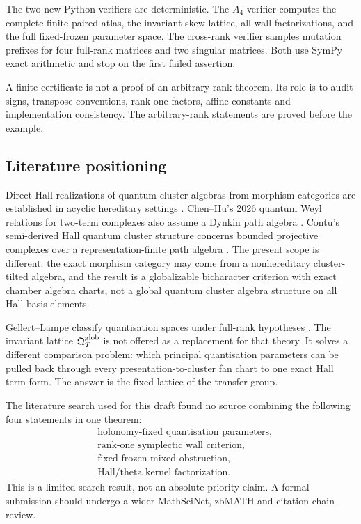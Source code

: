 The two new Python verifiers are deterministic.  The $A_4$ verifier computes
the complete finite paired atlas, the invariant skew lattice, all wall
factorizations, and the full fixed-frozen parameter space.  The cross-rank
verifier samples mutation prefixes for four full-rank matrices and two
singular matrices.  Both use SymPy exact arithmetic and stop on the first
failed assertion.

A finite certificate is not a proof of an arbitrary-rank theorem.  Its role is
to audit signs, transpose conventions, rank-one factors, affine constants and
implementation consistency.  The arbitrary-rank statements are proved before
the example.

\subsection{Literature positioning}

Direct Hall realizations of quantum cluster algebras from morphism categories
are established in acyclic hereditary settings
\cite{DingXuZhang,FuPengZhang}.  Chen--Hu's 2026 quantum Weyl relations for
two-term complexes also assume a Dynkin path algebra \cite{ChenHu}.  Contu's
semi-derived Hall quantum cluster structure concerns bounded projective
complexes over a representation-finite path algebra \cite{Contu}.  The present
scope is different: the exact morphism category may come from a
nonhereditary cluster-tilted algebra, and the result is a globalizable
bicharacter criterion with exact chamber algebra charts, not a global quantum
cluster algebra structure on all Hall basis elements.

Gellert--Lampe classify quantisation spaces under full-rank hypotheses
\cite{GellertLampe}.  The invariant lattice $\mathfrak Q^{\mathrm{glob}}_T$ is not offered as a
replacement for that theory.  It solves a different comparison problem: which
principal quantisation parameters can be pulled back through every
presentation-to-cluster fan chart to one exact Hall term form.  The answer is
the fixed lattice of the transfer group.

The literature search used for this draft found no source combining the
following four statements in one theorem:
\begin{align*}
 &\text{holonomy-fixed quantisation parameters},\\
 &\text{rank-one symplectic wall criterion},\\
 &\text{fixed-frozen mixed obstruction},\\
 &\text{Hall/theta kernel factorization}.
\end{align*}
This is a limited search result, not an absolute priority claim.  A formal
submission should undergo a wider MathSciNet, zbMATH and citation-chain review.

